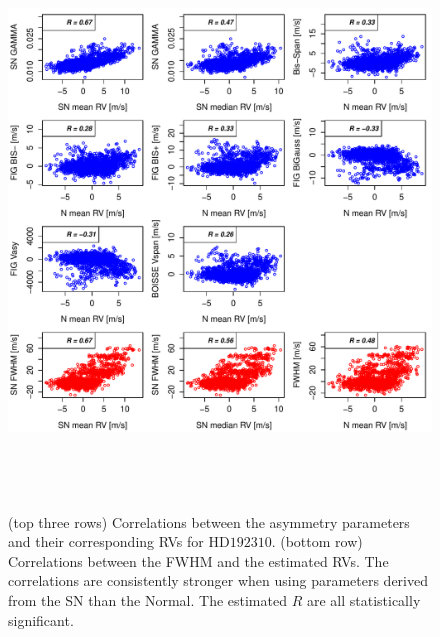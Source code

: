 \documentclass{aa}
\begin{document}
\begin{figure}[htbp]
\begin{center}
\includegraphics[height = 6in]{HD19231_[4]Comparison_para.pdf} 
   \caption{(top three rows) Correlations between the asymmetry parameters and their corresponding RVs for $\text{HD}192310$.  
   (bottom row) Correlations between the FWHM and the estimated RVs. 
   The correlations are consistently stronger when using parameters derived from the SN than the Normal. The estimated $R$ are all statistically significant.}   
   \label{fig:Gliese785:corrPlot}
\end{center}
\end{figure}
\end{document}
